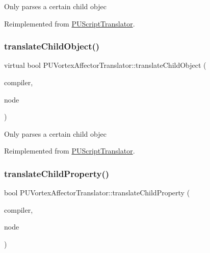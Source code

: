 Only parses a certain child objec 

Reimplemented from \hyperlink{classPUScriptTranslator_ab587d01348ae3e678cb700c719b2b113}{P\+U\+Script\+Translator}.

\mbox{\label{classPUVortexAffectorTranslator_a87591d4812a14a757f68dfe38ee1c109}} 
\subsubsection{\texorpdfstring{translate\+Child\+Object()}{translateChildObject()}\hspace{0.1cm}{\footnotesize\ttfamily [2/2]}}
{\footnotesize\ttfamily virtual bool P\+U\+Vortex\+Affector\+Translator\+::translate\+Child\+Object (\begin{DoxyParamCaption}\item[{\hyperlink{classPUScriptCompiler}{P\+U\+Script\+Compiler} $\ast$}]{compiler,  }\item[{\hyperlink{classPUAbstractNode}{P\+U\+Abstract\+Node} $\ast$}]{node }\end{DoxyParamCaption})\hspace{0.3cm}{\ttfamily [virtual]}}

Only parses a certain child objec 

Reimplemented from \hyperlink{classPUScriptTranslator_ab587d01348ae3e678cb700c719b2b113}{P\+U\+Script\+Translator}.

\mbox{\label{classPUVortexAffectorTranslator_aa452f3dfbbfabb4bddd341fbf39e5381}} 
\subsubsection{\texorpdfstring{translate\+Child\+Property()}{translateChildProperty()}\hspace{0.1cm}{\footnotesize\ttfamily [1/2]}}
{\footnotesize\ttfamily bool P\+U\+Vortex\+Affector\+Translator\+::translate\+Child\+Property (\begin{DoxyParamCaption}\item[{\hyperlink{classPUScriptCompiler}{P\+U\+Script\+Compiler} $\ast$}]{compiler,  }\item[{\hyperlink{classPUAbstractNode}{P\+U\+Abstract\+Node} $\ast$}]{node }\end{DoxyParamCaption})\hspace{0.3cm}{\ttfamily [virtual]}}


